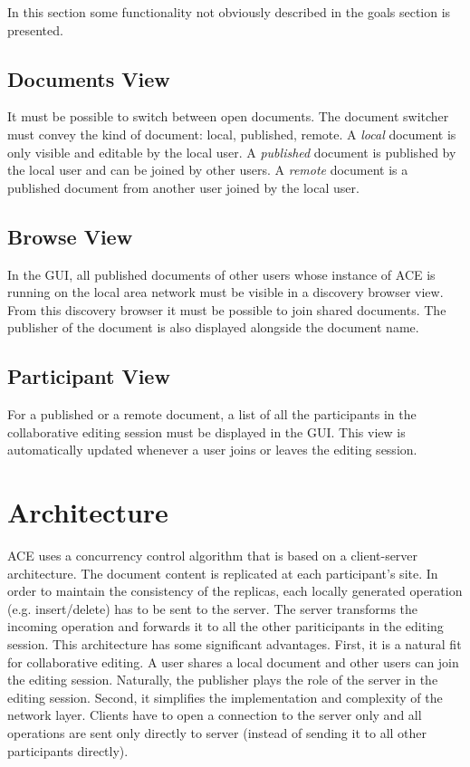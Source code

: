 \documentclass[11pt,a4paper]{article}
\begin{document}
In this section some functionality not obviously described in the goals section
is presented.

\subsection{Documents View}
It must be possible to switch between open documents. The document switcher must
convey the kind of document: local, published, remote. A
\emph{local} document is only visible and editable by the local user. A
\emph{published} document is published by the local user and can be joined by
other users. A \emph{remote} document is a published document from another
user joined by the local user.

\subsection{Browse View}
In the GUI, all published documents of other users whose instance of ACE
is running on the local area network must be visible in a discovery browser
view. From this discovery browser it must be possible to join shared documents.
The publisher of the document is also displayed alongside the document name.

\subsection{Participant View}
For a published or a remote document, a list of all the participants in the
collaborative editing session must be displayed in the GUI. This view is
automatically updated whenever a user joins or leaves the editing session.


\newpage
\section{Architecture}

ACE uses a concurrency control algorithm that is based on a client-server 
architecture. The document content is replicated at each participant's
site. In order to maintain the consistency of the replicas, each locally
generated operation (e.g. insert/delete) has to be sent to the server. The
server transforms the incoming operation and forwards it to all the other
pariticipants in the editing session. This architecture has some significant
advantages. First, it is a natural fit for collaborative editing. A user shares 
a local document and other users can join the editing session. Naturally, the
publisher plays the role of the server in the editing session. Second, it
simplifies the implementation and complexity of the network layer. Clients
have to open a connection to the server only and all operations are sent only
directly to server (instead of sending it to all other participants directly).
\end{document}
